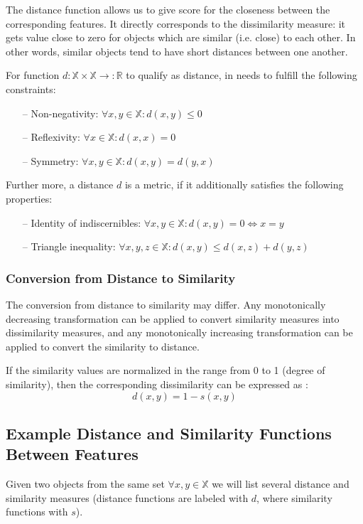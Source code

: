 The distance function allows us to give score for the closeness between the corresponding features.
It directly corresponds to the dissimilarity measure: it gets value close to zero for objects which are similar (i.e. close) to each other. 
In other words, similar objects tend to have short distances between one another.

For function $d:\mathds{X} \times \mathds{X} \rightarrow :\mathds{R}$ to qualify as distance, in needs to fulfill the following constraints\cite{Deza.Deza2009EncyclopediaofDistances}:
\begin{itemize}
	\item[--] Non-negativity: $\forall x,y \in \mathds{X}: d(x,y) \leqslant 0$
	\item[--] Reflexivity: $\forall x \in \mathds{X}: d(x,x) = 0$
	\item[--] Symmetry: $\forall x,y \in \mathds{X}: d(x,y) = d(y,x)$
\end{itemize}

Further more, a distance $d$ is a metric, if it additionally satisfies the following properties:
\begin{itemize}
	\item[--] Identity of indiscernibles: $\forall x,y \in \mathds{X}: d(x,y) = 0 \Leftrightarrow x=y$
	\item[--] Triangle inequality: $\forall x,y,z \in \mathds{X}: d(x,y) \leqslant d(x,z) + d(y,z)$
\end{itemize}

\subsubsection{Conversion from Distance to Similarity}

The conversion from distance to similarity may differ. 
Any monotonically decreasing transformation can be applied to convert similarity measures into dissimilarity measures, 
and any monotonically increasing transformation can be applied to convert the similarity to distance.

If the similarity values are normalized in the range from 0 to 1 (degree of similarity), then the corresponding dissimilarity can be expressed as : 
\begin{equation}
d(x,y) = 1 - s(x,y)
\label{dissim}
\end{equation}

\subsection{Example Distance and Similarity Functions Between Features}
Given two objects from the same set $\forall x,y \in \mathds{X}$ we will list several distance and similarity measures (distance functions are labeled with $d$, where similarity functions with $s$).
